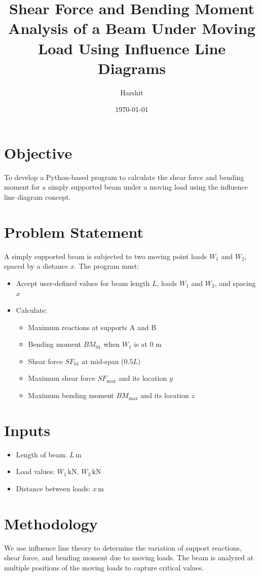 \documentclass[12pt,a4paper]{article}
\title{Shear Force and Bending Moment Analysis of a Beam Under Moving Load Using Influence Line Diagrams}
\author{Harshit}
\date{\today}
\begin{document}
\maketitle

\section*{Objective}
To develop a Python-based program to calculate the shear force and bending moment for a simply supported beam under a moving load using the influence line diagram concept.

\section*{Problem Statement}
A simply supported beam is subjected to two moving point loads \( W_1 \) and \( W_2 \), spaced by a distance \( x \). The program must:
\begin{itemize}
    \item Accept user-defined values for beam length \( L \), loads \( W_1 \) and \( W_2 \), and spacing \( x \)
    \item Calculate:
    \begin{itemize}
        \item Maximum reactions at supports A and B
        \item Bending moment \( BM_{01} \) when \( W_1 \) is at \( 0 \) m
        \item Shear force \( SF_{01} \) at mid-span (\( 0.5L \))
        \item Maximum shear force \( SF_{\text{max}} \) and its location \( y \)
        \item Maximum bending moment \( BM_{\text{max}} \) and its location \( z \)
    \end{itemize}
\end{itemize}

\section*{Inputs}
\begin{itemize}
    \item Length of beam: \( L \, \text{m} \)
    \item Load values: \( W_1 \, \text{kN}, \, W_2 \, \text{kN} \)
    \item Distance between loads: \( x \, \text{m} \)
\end{itemize}

\section*{Methodology}
We use influence line theory to determine the variation of support reactions, shear force, and bending moment due to moving loads. The beam is analyzed at multiple positions of the moving loads to capture critical values.
\end{document}
